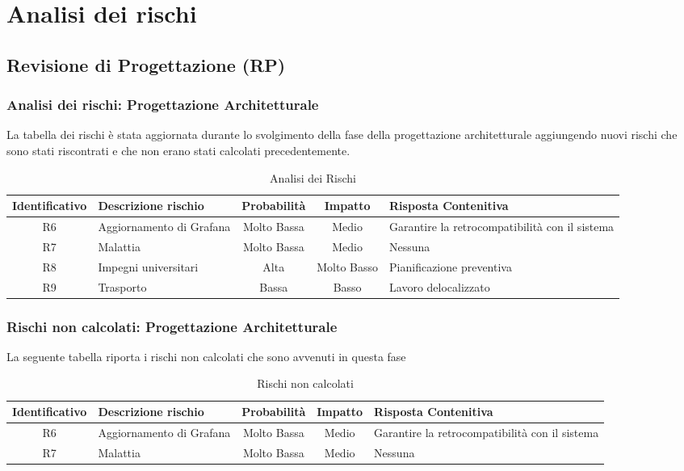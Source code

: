 \section{Analisi dei rischi}
\subsection{Revisione di Progettazione (RP)}
\subsubsection{Analisi dei rischi: Progettazione Architetturale}
La tabella dei rischi è stata aggiornata durante lo svolgimento della fase della progettazione architetturale aggiungendo nuovi rischi che sono stati riscontrati e che non erano stati calcolati precedentemente.
\begin{table}[!htpb]
		\centering
		\renewcommand{\arraystretch}{2} 
		\begin{tabular}{|c|p{3.6cm}|c|c|p{3.6cm}|}
			\rowcolor{orange!50}
			\hline
			\textbf{Identificativo} & \textbf{Descrizione rischio} & \textbf{Probabilità} & \textbf{Impatto} & \textbf{Risposta Contenitiva}\\
            \hline
			R6 & Aggiornamento di Grafana & Molto Bassa & Medio & Garantire la retrocompatibilità con il sistema\\
			\hline
			R7 & Malattia & Molto Bassa & Medio & Nessuna\\
			\hline
			R8 & Impegni universitari & Alta & Molto Basso & Pianificazione preventiva\\
			\hline
			R9 & Trasporto & Bassa & Basso & Lavoro delocalizzato\\
			\hline
		\end{tabular}
		\caption{Analisi dei Rischi}
	\end{table}
\newpage
\subsubsection{Rischi non calcolati: Progettazione Architetturale}
La seguente tabella riporta i rischi non calcolati che sono avvenuti in questa fase
\begin{table}[!htpb]
		\centering
		\renewcommand{\arraystretch}{2} 
		\rowcolors{2}{gray!25}{white}
		\begin{tabular}{|c|p{3.6cm}|c|c|p{3.6cm}|}
			\rowcolor{orange!50}
			\hline
			\textbf{Identificativo} & \textbf{Descrizione rischio} & \textbf{Probabilità} & \textbf{Impatto} & \textbf{Risposta Contenitiva}\\
            \hline
			R6 & Aggiornamento di Grafana & Molto Bassa & Medio & Garantire la retrocompatibilità con il sistema\\
			\hline
			R7 & Malattia & Molto Bassa & Medio & Nessuna\\
			\hline
		\end{tabular}
		\caption{Rischi non calcolati}
	\end{table}